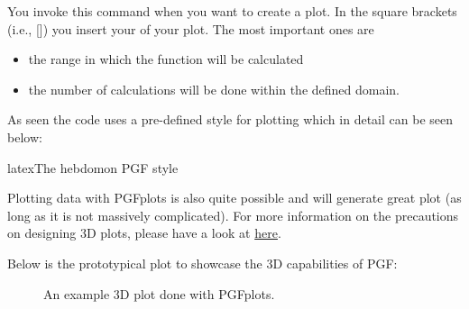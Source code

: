 \documentclass[minted, draw, cover = contour]{../tex/hebdomon}
\begin{document}
\begin{hgitemize}
	\item[\pcode{\addplot}] You invoke this command when you want to
	create a plot. In the square brackets (i.e., []) you insert your
	 of your plot. The most important ones are
	\begin{itemize}
		\item[\pcode{domain}] the range in which the function will be
		      calculated
		\item[\pcode{sample}] the number of calculations will be done
		      within the defined domain.
	\end{itemize}
\end{hgitemize}

As seen the code uses a pre-defined style for plotting which in detail can be seen below:

\begin{Code}{latex}{The hebdomon PGF style}
\end{Code}

\newpage


Plotting data with PGFplots is also quite possible and will generate
great plot (as long as it is not massively complicated). For more
information on the precautions on designing 3D plots, please have a look
at \href{https://tikz.dev/pgfplots/reference-3dplots}{here}.

Below is the prototypical plot to showcase the 3D capabilities of PGF:

\begin{figure}[!ht]
	\centering
	\caption{An example 3D plot done with PGFplots.}
\end{figure}
\end{document}

